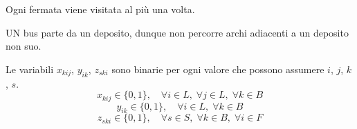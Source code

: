 Ogni fermata viene visitata al più una volta.

UN bus parte da un deposito, dunque non percorre archi adiacenti a un deposito non suo.

Le variabili $x_{kij}$, $y_{ik}$, $z_{ski}$ sono binarie per ogni valore che possono assumere $i$, $j$, $k$, $s$.
\begin{equation}
    x_{kij} \in \{0,1\},\quad \forall i \in L,\;\forall j \in L,\;\forall k \in B
\end{equation}
\begin{equation}
    y_{ik} \in \{0,1\},\quad \forall i \in L,\;\forall k \in B
\end{equation}
\begin{equation}
    z_{ski} \in \{0,1\},\quad \forall s \in S,\;\forall k \in B,\;\forall i \in F
\end{equation}

